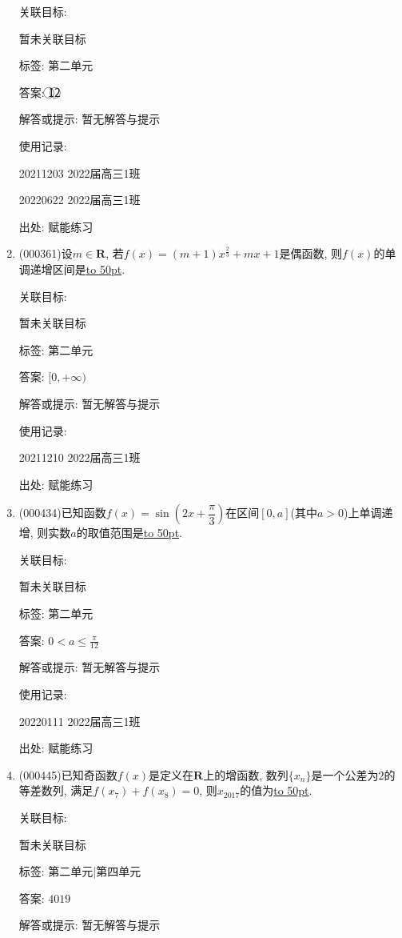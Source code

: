 \documentclass[10pt,a4paper]{article}
\newcommand{\blank}[1]{\underline{\hbox to #1pt{}}}
\begin{document}
\begin{enumerate}[1.]
关联目标:

暂未关联目标



标签: 第二单元

答案: \textcircled{1}\textcircled{2}

解答或提示: 暂无解答与提示

使用记录:

20211203	2022届高三1班	

20220622	2022届高三1班  	


出处: 赋能练习
\item { (000361)}设$m\in \mathbf{R}$, 若$f(x)=(m+1)x^{\tfrac{2}{3}}+mx+1$是偶函数, 则$f(x)$的单调递增区间是\blank{50}.


关联目标:

暂未关联目标



标签: 第二单元

答案: $[0,+\infty)$

解答或提示: 暂无解答与提示

使用记录:

20211210	2022届高三1班	


出处: 赋能练习
\item { (000434)}已知函数$f(x)=\sin (2x+\dfrac\pi 3)$在区间$[0,a]$(其中$a>0$)上单调递增, 则实数$a$的取值范围是\blank{50}.


关联目标:

暂未关联目标



标签: 第二单元

答案: $0<a\le \frac{\pi }{12}$

解答或提示: 暂无解答与提示

使用记录:

20220111	2022届高三1班	


出处: 赋能练习
\item { (000445)}已知奇函数$f(x)$是定义在$\mathbf{R}$上的增函数, 数列$\{x_n\}$是一个公差为$2$的等差数列, 满足$f(x_7)+f(x_8)=0$, 则$x_{2017}$的值为\blank{50}.


关联目标:

暂未关联目标



标签: 第二单元|第四单元

答案: $4019$

解答或提示: 暂无解答与提示


\end{enumerate}
\end{document}
